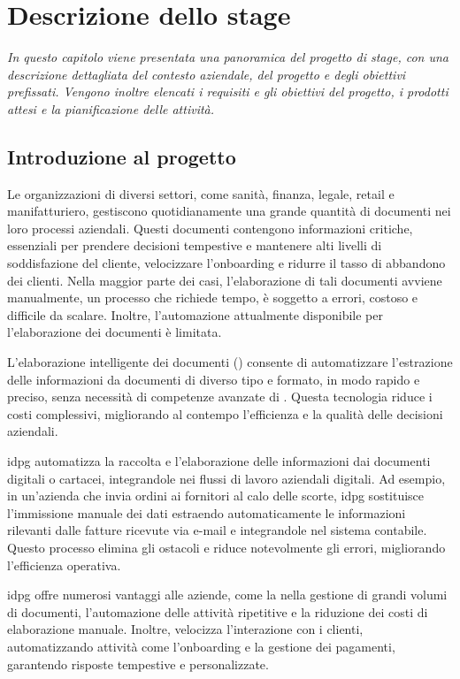 \chapter{Descrizione dello stage}
\label{cap:descrizione-stage}

\emph{In questo capitolo viene presentata una panoramica del progetto di stage, con una descrizione dettagliata del contesto aziendale, del progetto e degli obiettivi prefissati. Vengono inoltre elencati i requisiti e gli obiettivi del progetto, i prodotti attesi e la pianificazione delle attività.}

\section{Introduzione al progetto}

Le organizzazioni di diversi settori, come sanità, finanza, legale, retail e manifatturiero, gestiscono quotidianamente una grande quantità di documenti nei loro processi aziendali. Questi documenti contengono informazioni critiche, essenziali per prendere decisioni tempestive e mantenere alti livelli di soddisfazione del cliente, velocizzare l'onboarding e ridurre il tasso di abbandono dei clienti. Nella maggior parte dei casi, l'elaborazione di tali documenti avviene manualmente, un processo che richiede tempo, è soggetto a errori, costoso e difficile da scalare. Inoltre, l'automazione attualmente disponibile per l'elaborazione dei documenti è limitata.

L'elaborazione intelligente dei documenti () consente di automatizzare l'estrazione delle informazioni da documenti di diverso tipo e formato, in modo rapido e preciso, senza necessità di competenze avanzate di . Questa tecnologia riduce i costi complessivi, migliorando al contempo l'efficienza e la qualità delle decisioni aziendali.

\gls{idpg} automatizza la raccolta e l'elaborazione delle informazioni dai documenti digitali o cartacei, integrandole nei flussi di lavoro aziendali digitali. Ad esempio, in un'azienda che invia ordini ai fornitori al calo delle scorte, \gls{idpg} sostituisce l'immissione manuale dei dati estraendo automaticamente le informazioni rilevanti dalle fatture ricevute via e-mail e integrandole nel sistema contabile. Questo processo elimina gli ostacoli e riduce notevolmente gli errori, migliorando l'efficienza operativa.

\gls{idpg} offre numerosi vantaggi alle aziende, come la  nella gestione di grandi volumi di documenti, l'automazione delle attività ripetitive e la riduzione dei costi di elaborazione manuale. Inoltre, velocizza l'interazione con i clienti, automatizzando attività come l'onboarding e la gestione dei pagamenti, garantendo risposte tempestive e personalizzate. 


